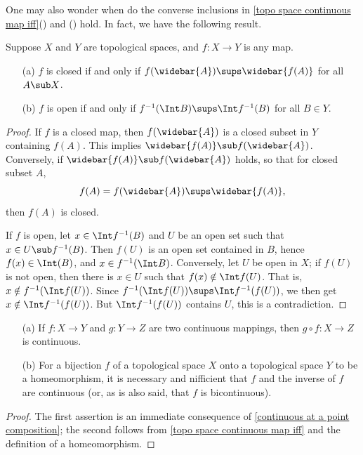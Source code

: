 One may also wonder when do the converse inclusions in \cref{topo space continuous map iff}() and () hold. In fact, we have the following result. 
\begin{proposition}
Suppose $X$ and $Y$ are topological spaces, and $f:X\to Y$ is any map.
\begin{enumerate}
\item[(a)] $f$ is closed if and only if $f(\widebar{A})\sups\widebar{f(A)}$ for all $A\sub X$.
\item[(b)] $f$ is open if and only if $f^{-1}(\Int B)\sups \Int f^{-1}(B)$ for all $B\in Y$.
\end{enumerate}
\end{proposition}
\begin{proof}
If $f$ is a closed map, then $f(\widebar{A})$ is a closed subset in $Y$ containing $f(A)$. This implies $\widebar{f(A)}\sub f(\widebar{A})$. Conversely, if $\widebar{f(A)}\sub f(\widebar{A})$ holds, so that for closed subset $A$,
\[f(A)=f(\widebar{A})\sups \widebar{f(A)},\]
then $f(A)$ is closed.\par
If $f$ is open, let $x\in\Int f^{-1}(B)$ and $U$ be an open set such that $x\in U\sub f^{-1}(B)$. Then $f(U)$ is an open set contained in $B$, hence $f(x)\in\Int(B)$, and $x\in f^{-1}(\Int B)$. Conversely, let $U$ be open in $X$; if $f(U)$ is not open, then there is $x\in U$ such that $f(x)\notin\Int f(U)$. That is, $x\notin f^{-1}(\Int f(U))$. Since $f^{-1}(\Int f(U))\sups\Int f^{-1}(f(U))$, we then get $x\notin\Int f^{-1}(f(U))$. But $\Int f^{-1}(f(U))$ contains $U$, this is a contradiction.
\end{proof}
\begin{proposition}
\mbox{}
\begin{itemize}
\item[(a)] If $f:X\to Y$ and $g:Y\to Z$ are two continuous mappings, then $g\circ f:X\to Z$ is continuous.
\item[(b)] For a bijection $f$ of a topological space $X$ onto a topological space $Y$ to be a homeomorphism, it is necessary and nifficient that $f$ and the inverse of $f$ are continuous (or, as is also said, that $f$ is bicontinuous).
\end{itemize}
\end{proposition}
\begin{proof}
The first assertion is an immediate consequence of \cref{continuous at a point composition}; the second follows from \cref{topo space continuous map iff} and the definition of a homeomorphism.
\end{proof}

